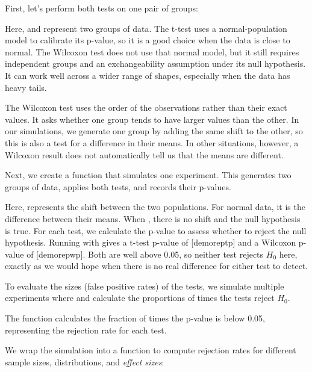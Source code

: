 \begin{example}
First, let's perform both tests on one pair of groups:


Here,  and  represent two groups of data. The t-test
uses a normal-population model to calibrate its p-value, so it is a
good choice when the data is close to normal. The Wilcoxon test does
not use that normal model, but it still requires independent groups and
an exchangeability assumption under its null hypothesis. It can work
well across a wider range of shapes, especially when the data has
heavy tails.

The Wilcoxon test uses the order of the observations rather than their
exact values. It asks whether one group tends to have larger values
than the other. In our simulations, we generate one group by adding
the same shift to the other, so this is also a test for a difference in
their means. In other situations, however, a Wilcoxon result does not
automatically tell us that the means are different.


Next, we create a function  that simulates one
experiment. This generates two groups of data, applies both tests, and
records their p-values.

Here,  represents the shift between the two populations.
For normal data, it is the difference between their means. When
, there is no shift and the null hypothesis is true.
For each test, we calculate the p-value to assess whether to reject the
null hypothesis. Running
 with  gives a t-test
p-value of [demoreptp] and a
Wilcoxon p-value of
[demorepwp]. Both are
well above 0.05, so neither test rejects $H_0$ here, exactly as we
would hope when there is no real difference for either test to detect.

To evaluate the sizes (false positive rates) of the tests, we simulate
multiple experiments where  and calculate the proportions of
times the tests reject $H_0$.

The function  calculates the fraction of
times the p-value is below 0.05, representing the rejection rate for
each test.


We wrap the simulation into a function  to
compute rejection rates for different sample sizes, distributions, and
\emph{effect sizes}:


\end{example}

